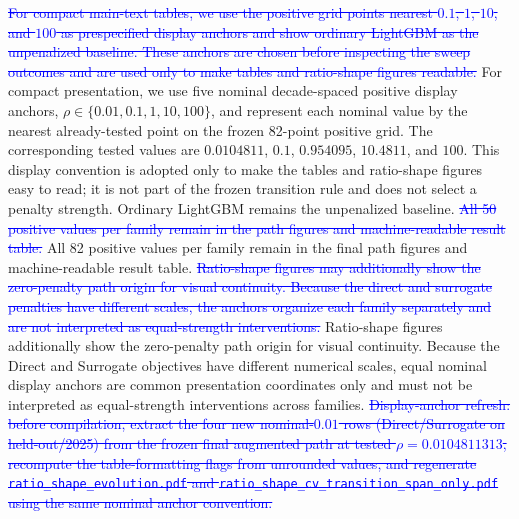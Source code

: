 \documentclass[10pt]{article}
\theoremstyle{definition}
\newcommand{\1}{\mathbf{1}}
\newcommand{\oldtext}[1]{\textcolor{blue}{\sout{#1}}}
\newcommand{\latesttext}[1]{\textcolor{latestPurple}{#1}}
\begin{document}
\oldtext{For compact main-text tables, we use the positive grid points nearest $0.1$, $1$, $10$, and $100$ as prespecified display anchors and show ordinary LightGBM as the unpenalized baseline. These anchors are chosen before inspecting the sweep outcomes and are used only to make tables and ratio-shape figures readable.}
\latesttext{For compact presentation, we use five nominal decade-spaced positive display anchors, $\rho\in\{0.01,0.1,1,10,100\}$, and represent each nominal value by the nearest already-tested point on the frozen 82-point positive grid. The corresponding tested values are $0.0104811$, $0.1$, $0.954095$, $10.4811$, and $100$. This display convention is adopted only to make the tables and ratio-shape figures easy to read; it is not part of the frozen transition rule and does not select a penalty strength. Ordinary LightGBM remains the unpenalized baseline.}
\oldtext{All 50 positive values per family remain in the path figures and machine-readable result table.}
\latesttext{All 82 positive values per family remain in the final path figures and machine-readable result table.}
\oldtext{Ratio-shape figures may additionally show the zero-penalty path origin for visual continuity. Because the direct and surrogate penalties have different scales, the anchors organize each family separately and are not interpreted as equal-strength interventions.}
\latesttext{Ratio-shape figures additionally show the zero-penalty path origin for visual continuity. Because the Direct and Surrogate objectives have different numerical scales, equal nominal display anchors are common presentation coordinates only and must not be interpreted as equal-strength interventions across families.}
\oldtext{Display-anchor refresh: before compilation, extract the four new nominal-$0.01$ rows (Direct/Surrogate on held-out/2025) from the frozen final augmented path at tested $\rho=0.0104811313$, recompute the table-formatting flags from unrounded values, and regenerate \texttt{ratio\_shape\_evolution.pdf} and \texttt{ratio\_shape\_cv\_transition\_span\_only.pdf} using the same nominal anchor convention.}
\end{document}

